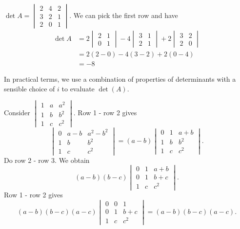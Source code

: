 \documentclass[a4paper]{article}
\begin{document}
\begin{eg}
  $\det A = \begin{vmatrix}2 & 4 & 2\\ 3 & 2 & 1\\ 2 & 0 & 1\end{vmatrix}$. We can pick the first row and have
  \begin{align*}
    \det A&= 2\begin{vmatrix}2 & 1\\0 & 1 \end{vmatrix} - 4\begin{vmatrix} 3 & 1\\ 2 & 1\end{vmatrix} + 2\begin{vmatrix}3 & 2 \\ 2 & 0\end{vmatrix}\\
    &= 2(2 - 0) - 4(3 - 2) + 2(0 - 4)\\
    &= -8
  \end{align*}
\end{eg}

In practical terms, we use a combination of properties of determinants with a sensible choice of $i$ to evaluate $\det(A)$.

\begin{eg}
  Consider $\begin{vmatrix}1 & a & a^2\\1 & b & b^2\\1 & c & c^2 \end{vmatrix}$. Row 1 - row 2 gives
  \[
    \begin{vmatrix}0 & a - b & a^2 - b^2\\1 & b & b^2\\1 & c & c^2 \end{vmatrix} = (a - b)\begin{vmatrix}0 & 1 & a + b\\1 & b & b^2\\1 & c & c^2 \end{vmatrix}.
  \]
  Do row 2 - row 3. We obtain
  \[
    (a - b)(b - c)\begin{vmatrix}0 & 1 & a + b\\0 & 1 & b + c\\1 & c & c^2 \end{vmatrix}.
  \]
  Row 1 - row 2 gives
  \[
    (a - b)(b - c)(a - c)\begin{vmatrix}0 & 0 & 1\\0 & 1 & b + c\\1 & c & c^2 \end{vmatrix} = (a - b)(b - c)(a - c).
  \]
\end{eg}
\end{document}
